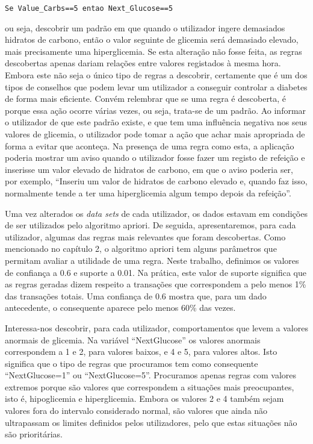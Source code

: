 \begin{lstlisting}
Se Value_Carbs==5 entao Next_Glucose==5
\end{lstlisting} 
ou seja, descobrir um padrão em que quando o utilizador ingere demasiados hidratos de carbono, então o valor seguinte de glicemia será demasiado elevado, mais precisamente uma hiperglicemia. Se esta alteração não fosse feita, as regras descobertas apenas dariam relações entre valores registados à mesma hora. Embora este não seja o único tipo de regras a descobrir, certamente que é um dos tipos de conselhos que podem levar um utilizador a conseguir controlar a diabetes de forma mais eficiente. Convém relembrar que se uma regra é descoberta, é porque essa ação ocorre várias vezes, ou seja, trata-se de um padrão. Ao informar o utilizador de que este padrão existe, e que tem uma influência negativa nos seus valores de glicemia, o utilizador pode tomar a ação que achar mais apropriada de forma a evitar que aconteça. Na presença de uma regra como esta, a aplicação poderia mostrar um aviso quando o utilizador fosse fazer um registo de refeição e inserisse um valor elevado de hidratos de carbono, em que o aviso poderia ser, por exemplo, ``Inseriu um valor de hidratos de carbono elevado e, quando faz isso, normalmente tende a ter uma hiperglicemia algum tempo depois da refeição''.

Uma vez alterados os \textit{data sets} de cada utilizador, os dados estavam em condições de ser utilizados pelo algoritmo apriori. De seguida, apresentaremos, para cada utilizador, algumas das regras mais relevantes que foram descobertas. Como mencionado no capítulo 2, o algoritmo apriori tem alguns parâmetros que permitam avaliar a utilidade de uma regra. Neste trabalho, definimos os valores de confiança a 0.6 e suporte a 0.01. Na prática, este valor de suporte significa que as regras geradas dizem respeito a transações que correspondem a pelo menos 1\% das transações totais. Uma confiança de 0.6 mostra que, para um dado antecedente, o consequente aparece pelo menos 60\% das vezes.

Interessa-nos descobrir, para cada utilizador, comportamentos que levem a valores anormais de glicemia. Na variável ``Next\textunderscore Glucose'' os valores anormais correspondem a 1 e 2, para valores baixos, e 4 e 5, para valores altos. Isto significa que o tipo de regras que procuramos tem como consequente ``Next\textunderscore Glucose=1'' ou ``Next\textunderscore Glucose=5''. Procuramos apenas regras com valores extremos porque são valores que correspondem a situações mais preocupantes, isto é, hipoglicemia e hiperglicemia. Embora os valores 2 e 4 também sejam valores fora do intervalo considerado normal, são valores que ainda não ultrapassam os limites definidos pelos utilizadores, pelo que estas situações não são prioritárias. 

